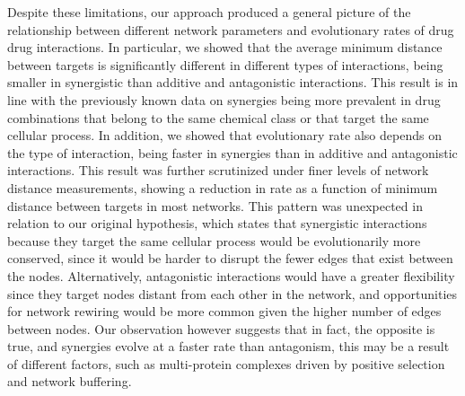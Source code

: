 \documentclass[]{elsarticle} %
\begin{document}
Despite these limitations, our approach produced a general picture of the relationship between different network parameters and evolutionary rates of drug drug interactions. In particular, we showed that the average minimum distance between targets is significantly different in different types of interactions, being smaller in synergistic than additive and antagonistic interactions. This result is in line with the previously known data on synergies being more prevalent in drug combinations that belong to the same chemical class or that target the same cellular process. In addition, we showed that evolutionary rate also depends on the type of interaction, being faster in synergies than in additive and antagonistic interactions. This result was further scrutinized under finer levels of network distance measurements, showing a reduction in rate as a function of minimum distance between targets in most networks. This pattern was unexpected in relation to our original hypothesis, which states that synergistic interactions because they target the same cellular process would be evolutionarily more conserved, since it would be harder to disrupt the fewer edges that exist between the nodes. Alternatively, antagonistic interactions would have a greater flexibility since they target nodes distant from each other in the network, and opportunities for network rewiring would be more common given the higher number of edges between nodes. Our observation however suggests that in fact, the opposite is true, and synergies evolve at a faster rate than antagonism, this may be a result of different factors, such as multi-protein complexes driven by positive selection and network buffering.
\end{document}
